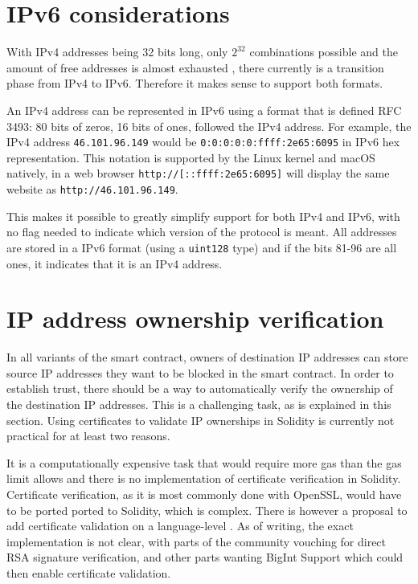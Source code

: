 \section{IPv6 considerations}

With IPv4 addresses being 32 bits long, only $ 2^{32} $ combinations possible and the amount of free addresses is almost exhausted \cite{IPv4Exhaustion}, there currently is a transition phase from IPv4 to IPv6. Therefore it makes sense to support both formats.

An IPv4 address can be represented in IPv6 using a format that is defined RFC 3493: 80 bits of zeros, 16 bits of ones, followed the IPv4 address. For example, the IPv4 address \texttt{46.101.96.149} would be \texttt{0:0:0:0:0:ffff:2e65:6095} in IPv6 hex representation. This notation is supported by the Linux kernel and macOS natively, in a web browser \texttt{http://[::ffff:2e65:6095]} will display the same website as \texttt{http://46.101.96.149}.

This makes it possible to greatly simplify support for both IPv4 and IPv6, with no flag needed to indicate which version of the protocol is meant. All addresses are stored in a IPv6 format (using a \texttt{uint128} type) and if the bits 81-96 are all ones, it indicates that it is an IPv4 address.





\section{IP address ownership verification}
In all variants of the smart contract, owners of destination IP addresses can store source IP addresses they want to be blocked in the smart contract. In order to establish trust, there should be a way to automatically verify the ownership of the destination IP addresses. This is a challenging task, as is explained in this section. Using certificates to validate IP ownerships in Solidity is currently not practical for at least two reasons.

It is a computationally expensive task that would require more gas than the gas limit allows and there is no implementation of certificate verification in Solidity. Certificate verification, as it is most commonly done with OpenSSL, would have to be ported ported to Solidity, which is complex.
There is however a proposal to add certificate validation on a language-level \cite{EIP74}. As of writing, the exact implementation is not clear, with parts of the community vouching for direct RSA signature verification, and other parts wanting BigInt Support which could then enable certificate validation.

